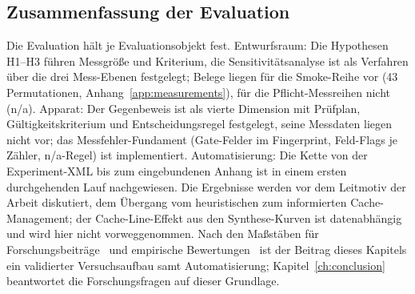 \begin{nurkurz}
\subsection{Zusammenfassung der Evaluation}\label{sec:eval-summary}
Die Evaluation hält je Evaluationsobjekt fest. Entwurfsraum: Die Hypothesen H1--H3 führen Messgröße und
Kriterium, die Sensitivitätsanalyse ist als Verfahren über die drei Mess-Ebenen festgelegt; Belege liegen
für die Smoke-Reihe vor (43 Permutationen, Anhang~\ref{app:measurements}), für die Pflicht-Messreihen
nicht (n/a). Apparat: Der Gegenbeweis ist als vierte Dimension mit Prüfplan, Gültigkeitskriterium und
Entscheidungsregel festgelegt, seine Messdaten liegen nicht vor; das Messfehler-Fundament (Gate-Felder im
Fingerprint, Feld-Flags je Zähler, n/a-Regel) ist implementiert. Automatisierung: Die Kette von der
Experiment-XML bis zum eingebundenen Anhang ist in einem ersten durchgehenden Lauf nachgewiesen. Die
Ergebnisse werden vor dem Leitmotiv der Arbeit diskutiert, dem Übergang vom heuristischen zum informierten
Cache-Management; der Cache-Line-Effekt aus den Synthese-Kurven ist datenabhängig und wird hier nicht
vorweggenommen. Nach den Maßstäben für Forschungsbeiträge~\cite{shaw2003writing} und empirische
Bewertungen~\cite{blackburn2016truth} ist der Beitrag dieses Kapitels ein validierter Versuchsaufbau samt
Automatisierung; Kapitel~\ref{ch:conclusion} beantwortet die Forschungsfragen auf dieser Grundlage.
\end{nurkurz}
